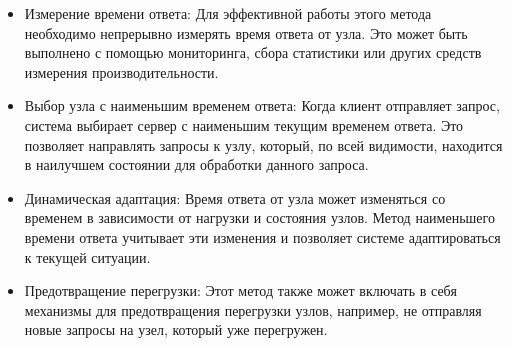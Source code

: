 \begin{itemize}
	\item Измерение времени ответа: Для эффективной работы этого метода необходимо непрерывно измерять время ответа от узла. Это может быть выполнено с помощью мониторинга, сбора статистики или других средств измерения производительности.
	
	\item Выбор узла с наименьшим временем ответа: Когда клиент отправляет запрос, система выбирает сервер с наименьшим текущим временем ответа. Это позволяет направлять запросы к узлу, который, по всей видимости, находится в наилучшем состоянии для обработки данного запроса.
	
	\item Динамическая адаптация: Время ответа от узла может изменяться со временем в зависимости от нагрузки и состояния узлов. Метод наименьшего времени ответа учитывает эти изменения и позволяет системе адаптироваться к текущей ситуации.
	
	\item Предотвращение перегрузки: Этот метод также может включать в себя механизмы для предотвращения перегрузки узлов, например, не отправляя новые запросы на узел, который уже перегружен.
\end{itemize} 